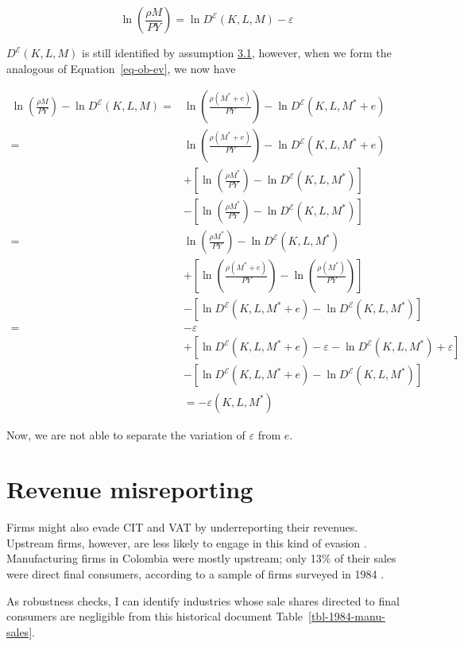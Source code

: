 \documentclass[
  12pt]{article}
\theoremstyle{definition}
\theoremstyle{remark}
\begin{document}
\[
\ln\left(\frac{\rho M}{PY}\right)=\ln D^{\mathcal{E}}(K,L,M)-\varepsilon
\]

\(D^{\mathcal{E}}(K,L,M)\) is still identified by assumption
\hyperref[ass-non-ev]{3.1}, however, when we form the analogous of
Equation~\ref{eq-ob-ev}, we now have

\[
\begin{aligned}
\ln\left(\frac{\rho M}{PY}\right)-\ln D^{\mathcal{E}}(K,L,M)=&\ln\left(\frac{\rho(M^*+e)}{PY}\right)-\ln D^{\mathcal{E}}(K,L,M^*+e)\\
=&\ln\left(\frac{\rho(M^*+e)}{PY}\right)-\ln D^{\mathcal{E}}(K,L,M^*+e)\\
&+\left[\ln\left(\frac{\rho M^*}{PY}\right)-\ln D^{\mathcal{E}}(K,L,M^*)\right]\\
&-\left[\ln\left(\frac{\rho M^*}{PY}\right)-\ln D^{\mathcal{E}}(K,L,M^*)\right] \\
=&\ln\left(\frac{\rho M^*}{PY}\right)-\ln D^{\mathcal{E}}(K,L,M^*) \\
&+\left[\ln\left(\frac{\rho(M^*+e)}{PY}\right)-\ln\left(\frac{\rho(M^*)}{PY}\right)\right]\\
&-\left[\ln D^{\mathcal{E}}(K,L,M^*+e)-\ln D^{\mathcal{E}}(K,L,M^*)\right]\\
=& -\varepsilon \\
&+\left[\ln D^{\mathcal{E}}(K,L,M^*+e)-\varepsilon-\ln D^{\mathcal{E}}(K,L,M^*)+\varepsilon\right]\\
&-\left[\ln D^{\mathcal{E}}(K,L,M^*+e)-\ln D^{\mathcal{E}}(K,L,M^*)\right]\\
&= -\varepsilon(K,L,M^*)
\end{aligned}
\]

Now, we are not able to separate the variation of \(\varepsilon\) from
\(e\).

\section{Revenue misreporting}\label{revenue-misreporting}

Firms might also evade CIT and VAT by underreporting their revenues.
Upstream firms, however, are less likely to engage in this kind of
evasion \citep{Almunia2018}. Manufacturing firms in Colombia were mostly
upstream; only 13\% of their sales were direct final consumers,
according to a sample of firms surveyed in 1984 \citep{Perry1990}.

As robustness checks, I can identify industries whose sale shares
directed to final consumers are negligible from this historical document
Table~\ref{tbl-1984-manu-sales}.
\end{document}

